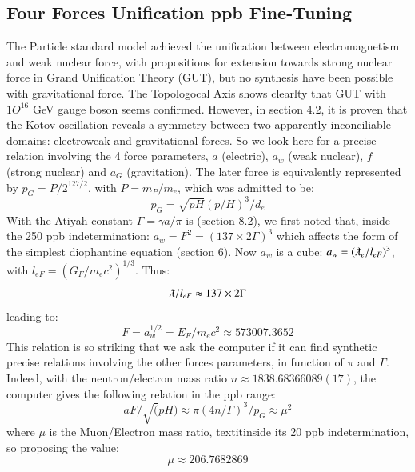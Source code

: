 \documentclass[twoside,draft]{article}
\begin{document}
\begin{sloppypar}
\subsection {Four Forces Unification ppb Fine-Tuning}
The Particle standard model achieved the unification between electromagnetism and weak nuclear force, with propositions for extension towards strong nuclear force in Grand Unification Theory (GUT), but no synthesis have been possible with gravitational force. The Topologocal Axis shows clearlty that GUT with $1O^{16}$ GeV gauge boson seems confirmed. However, in section 4.2, it is proven that the Kotov oscillation reveals a symmetry between two apparently inconciliable domains: electroweak and gravitational forces. So we look here for a precise relation involving the 4 force parameters, $a$ (electric), $a_w$ (weak nuclear), $f$ (strong nuclear) and $a_G$ (gravitation). The later force is equivalently represented by $p_G = P/2^{127/2}$, with $P = m_P/m_e$, which was admitted to be:
\begin{equation}
p_G = \sqrt{pH} (p/H)^3/d_e
\end{equation}
 With the Atiyah constant $\Gamma = \gamma a/\pi$ is (section 8.2), we first noted that, inside the 250 ppb indetermination:  
 $a_{w} = F^2 = (137 \times 2 \Gamma)^{3}$
 which affects the form of the simplest diophantine equation (section 6).
 Now $a_{w}$ is a cube: $a_{w} = (\lambdabar_{e}/l_{eF})^{3}$, with $l_{eF} = (G_{F}/m_{e} c^{2})^{1/3}$. Thus:    
\begin{equation}
\lambdabar/l_{eF} \approx 137 \times 2\Gamma
\end{equation}
leading to:
\begin{equation} 
F = a_{w}^{1/2} = E_{F} /m_{e} c^{2} \approx 573007.3652
\end{equation}
This relation is so striking that we ask the computer if it can find synthetic precise relations involving the other forces parameters, in function of $\pi$ and $\Gamma$. Indeed, with the neutron/electron mass ratio $n \approx 1838.68366089(17)$, the computer gives the following relation in the ppb range:
\begin{equation}
aF/\sqrt(pH) \approx \pi(4n/\Gamma)^3/p_G \approx \mu^2
\end{equation}
where $\mu$ is the Muon/Electron mass ratio, textit{inside its 20 ppb indetermination}, so proposing the value:
\begin{equation}
\mu \approx 206.7682869
\end{equation}


\end{sloppypar}
\end{document}
